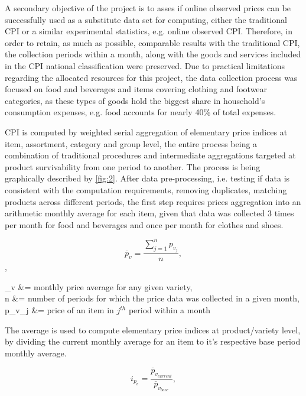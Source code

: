 \documentclass[]{article}
\begin{document}
A secondary objective of the project is to asses if online observed prices can be successfully
used as a substitute data set for computing, either the traditional CPI or a similar 
experimental statistics, e.g. online observed CPI. Therefore, in order to retain, 
as much as possible, comparable results with the traditional CPI, the collection periods 
within a month, along with the goods and services included in the CPI national classification 
were preserved. Due to practical limitations regarding the allocated resources for 
this project, the data collection process was focused on food and beverages and items 
covering clothing and footwear categories, as these types of goods hold the biggest share in 
household's consumption expenses, e.g. food accounts for nearly 40\% of total expenses\cite{hhs}. 

CPI is computed by weighted serial aggregation of elementary price indices at item, assortment, 
category and group level, the entire process being a combination of traditional procedures\cite{cpi} 
and intermediate aggregations targeted at product survivability from one period to another. 
The process is being graphically described by \ref{fig:2}. After data pre-processing, i.e. testing 
if data is consistent with the computation requirements, removing duplicates, matching 
products across different periods, the first step requires prices aggregation into an arithmetic 
monthly average for each item, given that data was collected 3 times per month for food and 
beverages and once per month for clothes and shoes. 

\begin{equation}\label{eq:1}
\overline{p}_{v} = \frac{\sum_{j=1}^n {p_{v_{j}}}}{n} ,
\end{equation} ,

\begin{center} 	
	_{v} &= monthly price average for any given variety, \\
	n &= number of periods for which the price data was collected in a given month, \\
	p_{v_{j}} &= price of an item in $j^{th}$ period within a month	
\end{center}

The average is used to compute elementary 
price indices at product/variety level, by dividing the current monthly average for an item to it's respective base period monthly average. 

\begin{equation}\label{eq:2}
i_{p_{v}} = \frac{\overline{p}_{v_{current}}}{\overline{p}_{v_{base}}} ,
\end{equation}
\end{document}
